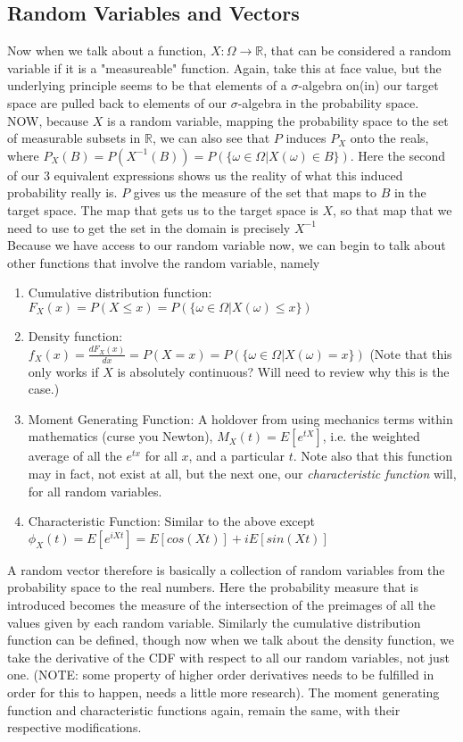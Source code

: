 \documentclass[12pt]{book}
\theoremstyle{definition}
\begin{document}
\subsection{Random Variables and Vectors}
Now when we talk about a function, $X: \Omega \to \mathbb{R}$, that can be considered a random variable if it is a "measureable" function. Again, take this at face value, but the underlying principle seems to be that elements of a $\sigma$-algebra on(in) our target space are pulled back to elements of  our $\sigma$-algebra in the probability space. \\
NOW, because $X$ is a random variable, mapping the probability space to the set of measurable subsets in $\mathbb{R}$, we can also see that $P$ induces $P_X$ onto the reals, where $P_X(B) = P(X^{-1}(B)) = P(\{\omega \in \Omega| X(\omega) \in B\})$. Here the second of our 3 equivalent expressions shows us the reality of what this induced probability really is. $P$ gives us the measure of the set that maps to $B$ in the target space. The map that gets us to the target space is $X$, so that map that we need to use to get the set in the domain is precisely $X^{-1}$\\
Because we have access to our random variable now, we can begin to talk about other functions that involve the random variable, namely \begin{enumerate}
    \item Cumulative distribution function: $F_X(x) = P(X \leq x) = P(\{\omega \in \Omega | X(\omega) \leq x\})$
    \item Density function: $f_X(x) = \frac{dF_X(x)}{dx} = P(X = x) = P(\{\omega \in \Omega| X(\omega) = x\})$ (Note that this only works if $X$ is absolutely continuous? Will need to review why this is the case.)
    \item Moment Generating Function: A holdover from using mechanics terms within mathematics (curse you Newton), $M_X(t) = E[e^{tX}]$, i.e. the weighted average of all the $e^{tx}$ for all $x$, and a particular $t$. Note also that this function may in fact, not exist at all, but the next one, our \textit{characteristic function} will, for all random variables.
    \item Characteristic Function: Similar to the above except $\phi_X(t) = E[e^{iXt}] = E[cos(Xt)] + iE[sin(Xt)]$
\end{enumerate}
A random vector therefore is basically a collection of random variables from the probability space to the real numbers. Here the probability measure that is introduced becomes the measure of the intersection of the preimages of all the values given by each random variable. Similarly the cumulative distribution function can be defined, though now when we talk about the density function, we take the derivative of the CDF with respect to all our random variables, not just one. (NOTE: some property of higher order derivatives needs to be fulfilled in order for this to happen, needs a little more research). The moment generating function and characteristic functions again, remain the same, with their respective modifications.
\end{document}
